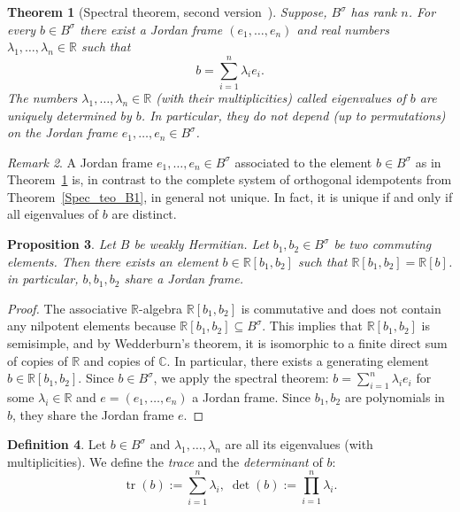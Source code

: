 \documentclass[a4paper,oneside,11pt]{amsart}
\DeclareMathOperator{\tr}{tr}
\newcommand{\R}{\mathbb R}
\newcommand{\CC}{\mathbb C}
\theoremstyle{plain}
\newtheorem{teo}{Theorem}[section]
\newtheorem{prop}[teo]{Proposition}
\theoremstyle{definition}
\newtheorem{df}[teo]{Definition}
\theoremstyle{remark}
\newtheorem{rem}[teo]{Remark}
\newcommand{\defin}{\emph}
\begin{document}
\begin{teo}[Spectral theorem, second version~{\cite[Theorem~III.1.2]{Faraut}}]\label{Spec_teo_B2}
Suppose, $B^{\sigma}$ has rank $n$. For every $b\in B^{\sigma}$ there exist a Jordan frame $(e_1,\dots,e_n)$ and real numbers $\lambda_1,\dots,\lambda_n\in\R$ such that
$$b=\sum_{i=1}^n\lambda_ie_i.$$
The numbers $\lambda_1,\dots,\lambda_n\in\R$ (with their multiplicities) called \defin{eigenvalues} of $b$ are uniquely determined by $b$. In particular, they do not depend (up to permutations) on the Jordan frame $e_1,\dots,e_n\in B^{\sigma}$.
\end{teo}

\begin{rem}
A Jordan frame $e_1,\dots,e_n\in B^{\sigma}$ associated to the element $b\in B^{\sigma}$ as in Theorem~\ref{Spec_teo_B2} is, in contrast to the complete system of orthogonal idempotents from Theorem~\ref{Spec_teo_B1}, in general not unique. In fact, it is unique if and only if all eigenvalues of $b$ are distinct.
\end{rem} 

\begin{prop} Let $B$ be weakly Hermitian.
    Let $b_1,b_2\in B^\sigma$ be two commuting elements. Then there exists an element $b\in\R[b_1,b_2]$ such that $\R[b_1,b_2]=\R[b]$. in particular, $b,b_1,b_2$ share a Jordan frame.
\end{prop}

\begin{proof}
    The associative $\R$-algebra $\R[b_1,b_2]$ is commutative and does not contain any nilpotent elements because $\R[b_1,b_2]\subseteq B^\sigma$. This implies that $\R[b_1,b_2]$ is semisimple, and by Wedderburn's theorem, it is isomorphic to a finite direct sum of copies of $\R$ and copies of $\CC$. In particular, there exists a generating element $b\in \R[b_1,b_2]$. Since $b\in B^\sigma$, we apply the spectral theorem: $b=\sum_{i=1}^n \lambda_i e_i$ for some $\lambda_i\in\R$ and $e=(e_1,\dots,e_n)$ a Jordan frame. Since $b_1,b_2$ are polynomials in $b$, they share the Jordan frame $e$.   
\end{proof}

\begin{df}\label{tr_det}
Let $b\in B^{\sigma}$ and $\lambda_1,\dots,\lambda_n$ are all its eigenvalues (with multiplicities). We define the \defin{trace} and the \defin{determinant} of $b$:
$$\tr(b):=\sum_{i=1}^n \lambda_i,\; \det(b):=\prod_{i=1}^n \lambda_i.$$
\end{df}
\end{document}

